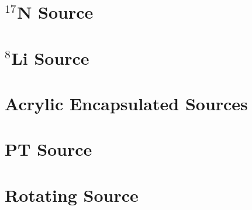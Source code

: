   
\section{$^{17}$N Source}
 
  
  
\section{$^{8}$Li Source}
 
  
  
\section{Acrylic Encapsulated Sources}
 
  
  
\section{PT Source}
 
  
\section{Rotating Source}
 
